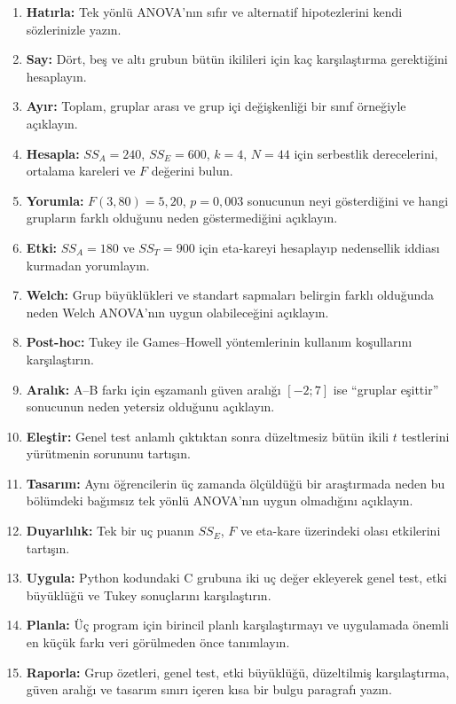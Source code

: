 \begin{enumerate}
\renewcommand{\labelenumi}{\textbf{\Alph{enumi}.}}
  \item \textbf{Hatırla:} Tek yönlü ANOVA'nın sıfır ve alternatif hipotezlerini kendi sözlerinizle yazın.
  \item \textbf{Say:} Dört, beş ve altı grubun bütün ikilileri için kaç karşılaştırma gerektiğini hesaplayın.
  \item \textbf{Ayır:} Toplam, gruplar arası ve grup içi değişkenliği bir sınıf örneğiyle açıklayın.
  \item \textbf{Hesapla:} $SS_A=240$, $SS_E=600$, $k=4$, $N=44$ için serbestlik derecelerini, ortalama kareleri ve $F$ değerini bulun.
  \item \textbf{Yorumla:} $F(3,80)=5{,}20$, $p=0{,}003$ sonucunun neyi gösterdiğini ve hangi grupların farklı olduğunu neden göstermediğini açıklayın.
  \item \textbf{Etki:} $SS_A=180$ ve $SS_T=900$ için eta-kareyi hesaplayıp nedensellik iddiası kurmadan yorumlayın.
  \item \textbf{Welch:} Grup büyüklükleri ve standart sapmaları belirgin farklı olduğunda neden Welch ANOVA'nın uygun olabileceğini açıklayın.
  \item \textbf{Post-hoc:} Tukey ile Games--Howell yöntemlerinin kullanım koşullarını karşılaştırın.
  \item \textbf{Aralık:} A--B farkı için eşzamanlı güven aralığı $[-2;7]$ ise ``gruplar eşittir'' sonucunun neden yetersiz olduğunu açıklayın.
  \item \textbf{Eleştir:} Genel test anlamlı çıktıktan sonra düzeltmesiz bütün ikili $t$ testlerini yürütmenin sorununu tartışın.
  \item \textbf{Tasarım:} Aynı öğrencilerin üç zamanda ölçüldüğü bir araştırmada neden bu bölümdeki bağımsız tek yönlü ANOVA'nın uygun olmadığını açıklayın.
  \item \textbf{Duyarlılık:} Tek bir uç puanın $SS_E$, $F$ ve eta-kare üzerindeki olası etkilerini tartışın.
  \item \textbf{Uygula:} Python kodundaki C grubuna iki uç değer ekleyerek genel test, etki büyüklüğü ve Tukey sonuçlarını karşılaştırın.
  \item \textbf{Planla:} Üç program için birincil planlı karşılaştırmayı ve uygulamada önemli en küçük farkı veri görülmeden önce tanımlayın.
  \item \textbf{Raporla:} Grup özetleri, genel test, etki büyüklüğü, düzeltilmiş karşılaştırma, güven aralığı ve tasarım sınırı içeren kısa bir bulgu paragrafı yazın.
\end{enumerate}

